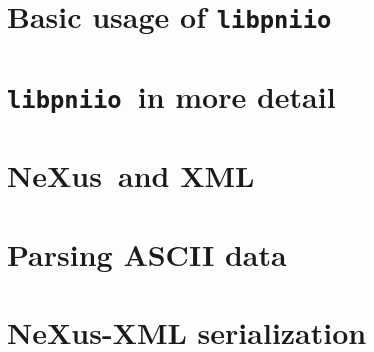 \documentclass[a4paper,draft]{scrbook}
\newcommand{\libpniio}{\texttt{libpniio}}
\newcommand{\nexus}{NeXus}
\begin{document}
\chapter{Basic usage of \libpniio}\label{chapter:basicusage}

\FloatBarrier


\chapter{\libpniio\ in more detail}\label{chapter:advancedusage}

\FloatBarrier

\chapter{\nexus\ and XML}

\FloatBarrier

\appendix
\chapter{Parsing ASCII data}\label{appendix:parsers}

\FloatBarrier

\chapter{\nexus-XML serialization}




\end{document}
